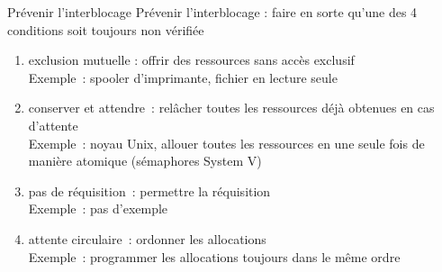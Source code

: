 \begin {frame} {Prévenir l'interblocage}
    Prévenir l'interblocage : faire en sorte qu'une des 4 conditions
    soit toujours non vérifiée

    \begin {enumerate}
	\item exclusion mutuelle : offrir des ressources sans accès
	    exclusif \\
	    Exemple~: spooler d'imprimante, fichier en lecture seule

	\item conserver et attendre~: relâcher toutes les ressources
	    déjà obtenues en cas d'attente \\
	    Exemple~: noyau Unix, allouer toutes les ressources en
	    une seule fois de manière atomique (sémaphores System V)

	\item pas de réquisition~: permettre la réquisition \\
	    Exemple~: pas d'exemple

	\item attente circulaire~: ordonner les allocations \\
	    Exemple~: programmer les allocations toujours dans le
	    même ordre

    \end {enumerate}

\end {frame}

